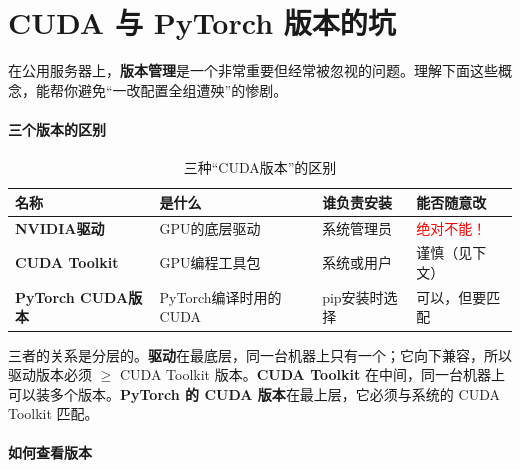 \section*{CUDA 与 PyTorch 版本的坑}


在公用服务器上，\textbf{版本管理}是一个非常重要但经常被忽视的问题。理解下面这些概念，能帮你避免“一改配置全组遭殃”的惨剧。

\paragraph{三个版本的区别}\mbox{}\par\nopagebreak

\begin{table}[H]
\centering
\small
\renewcommand{\arraystretch}{1.4}
\begin{tabularx}{\textwidth}{l|X|l|l}
\toprule
\textbf{名称} & \textbf{是什么} & \textbf{谁负责安装} & \textbf{能否随意改} \\
\midrule
\textbf{NVIDIA驱动} & GPU的底层驱动 & 系统管理员 & \textcolor{red}{绝对不能！} \\
\textbf{CUDA Toolkit} & GPU编程工具包 & 系统或用户 & 谨慎（见下文） \\
\textbf{PyTorch CUDA版本} & PyTorch编译时用的CUDA & pip安装时选择 & 可以，但要匹配 \\
\bottomrule
\end{tabularx}
\caption{三种“CUDA版本”的区别}
\end{table}

\begin{keyidea}[版本兼容的关键原则]
三者的关系是分层的。\textbf{驱动}在最底层，同一台机器上只有一个；它向下兼容，所以驱动版本必须 $\geq$ CUDA Toolkit 版本。\textbf{CUDA Toolkit} 在中间，同一台机器上可以装多个版本。\textbf{PyTorch 的 CUDA 版本}在最上层，它必须与系统的 CUDA Toolkit 匹配。
\end{keyidea}

\paragraph{如何查看版本}\mbox{}\par\nopagebreak

